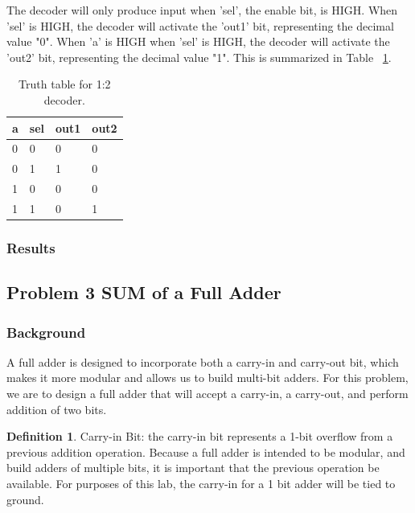\documentclass[11pt]{article}
\begin{document}
The decoder will only produce input when 'sel', the enable bit, is HIGH. When 'sel' is HIGH, the decoder will activate the 'out1' bit, representing the decimal value "0". When 'a' is HIGH when 'sel' is HIGH, the decoder will activate the 'out2' bit, representing the decimal value "1". This is summarized in Table ~\ref{tab:decoderTruthTable}.

\begin{table}[h]
\begin{center}
	\begin{tabular}{| l | l | l | l |}
		\hline
		a & sel & out1 & out2 \\ \hline
		0 & 0 & 0 & 0 \\ \hline
		0 & 1 & 1 & 0 \\ \hline
		1 & 0 & 0 & 0 \\ \hline
		1 & 1 & 0 & 1 \\ \hline
	\end{tabular}
	\caption{\label{tab:decoderTruthTable} Truth table for 1:2 decoder.}
	\label{tab:decoderTruthTable}
\end{center}
\end{table}

\subsubsection{Results}

\subsection{Problem 3 SUM of a Full Adder}

\subsubsection{Background}

A full adder is designed to incorporate both a carry-in and carry-out bit, which makes it more modular and allows us to build multi-bit adders. For this problem, we are to design a full adder that will accept a carry-in, a carry-out, and perform addition of two bits.

\theoremstyle{definition}
\newtheorem{definition}{Definition}
\begin{definition}
Carry-in Bit: the carry-in bit represents a 1-bit overflow from a previous addition operation. Because a full adder is intended to be modular, and build adders of multiple bits, it is important that the previous operation be available. For purposes of this lab, the carry-in for a 1 bit adder will be tied to ground.
\end{definition}
\end{document}
